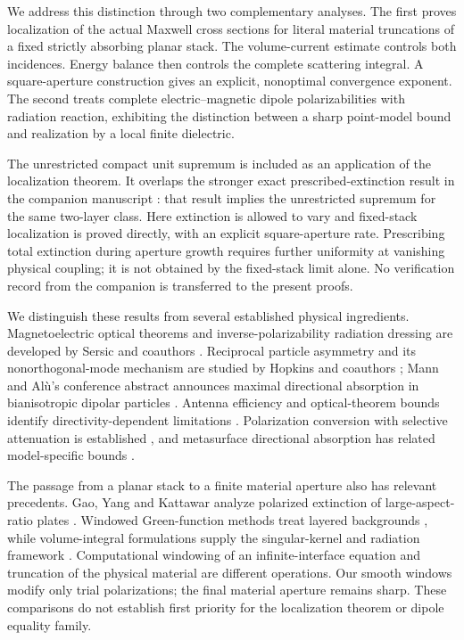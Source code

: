 \documentclass[11pt,a4paper]{article}
\theoremstyle{remark}
\begin{document}
We address this distinction through two complementary analyses. The first proves localization of the actual Maxwell cross sections for literal material truncations of a fixed strictly absorbing planar stack. The volume-current estimate controls both incidences. Energy balance then controls the complete scattering integral. A square-aperture construction gives an explicit, nonoptimal convergence exponent. The second treats complete electric--magnetic dipole polarizabilities with radiation reaction, exhibiting the distinction between a sharp point-model bound and realization by a local finite dielectric.

The unrestricted compact unit supremum is included as an application of the localization theorem. It overlaps the stronger exact prescribed-extinction result in the companion manuscript \citep{WangZhengPrescribed2026}: that result implies the unrestricted supremum for the same two-layer class. Here extinction is allowed to vary and fixed-stack localization is proved directly, with an explicit square-aperture rate. Prescribing total extinction during aperture growth requires further uniformity at vanishing physical coupling; it is not obtained by the fixed-stack limit alone. No verification record from the companion is transferred to the present proofs.

We distinguish these results from several established physical ingredients. Magnetoelectric optical theorems and inverse-polarizability radiation dressing are developed by Sersic and coauthors \citep{Sersic2011}. Reciprocal particle asymmetry and its nonorthogonal-mode mechanism are studied by Hopkins and coauthors \citep{Hopkins2015}; Mann and Al\`u's conference abstract announces maximal directional absorption in bianisotropic dipolar particles \citep{MannAlu2023}. Antenna efficiency and optical-theorem bounds identify directivity-dependent limitations \citep{Andersen2005,Liberal2014}. Polarization conversion with selective attenuation is established \citep{Armitage2014,Khurgin2021}, and metasurface directional absorption has related model-specific bounds \citep{ManezEspina2026}.

The passage from a planar stack to a finite material aperture also has relevant precedents. Gao, Yang and Kattawar analyze polarized extinction of large-aspect-ratio plates \citep{Gao2013}. Windowed Green-function methods treat layered backgrounds \citep{Bruno2016,Arrieta2022}, while volume-integral formulations supply the singular-kernel and radiation framework \citep{Yurkin2018,Mishchenko2018}. Computational windowing of an infinite-interface equation and truncation of the physical material are different operations. Our smooth windows modify only trial polarizations; the final material aperture remains sharp. These comparisons do not establish first priority for the localization theorem or dipole equality family.
\end{document}

